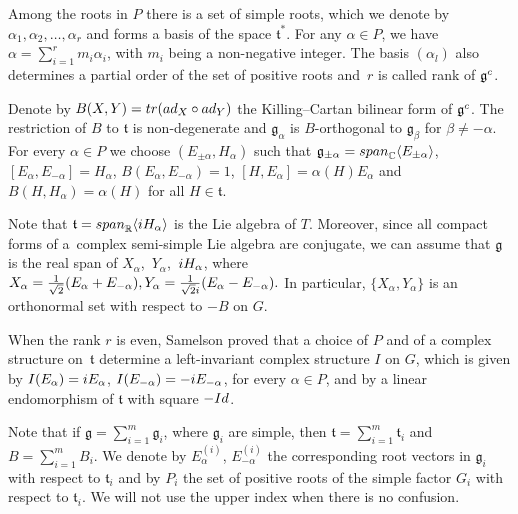 \documentclass[11pt]{article}
\numberwithin{equation}{section}
\numberwithin{equation}{section}
\begin{document}
Among the roots in $P$ there is a set of simple roots, which we denote by $\alpha_1, \alpha_2,\dots ,\alpha_r$ and forms a basis of the space $\mathfrak t^*$. For any $\alpha \in P$, we have $\alpha = \sum_{i =1}^r m_i\alpha_i$, with $m_i$ being a non-negative integer. The basis $(\alpha_l)$ also determines a partial order of the set of positive roots and~$r$ is called rank of $\mathfrak g^{\rm c}$.

Denote by $B(X,Y) = {\rm tr} ({\rm ad}_X \circ {\rm ad}_Y)$ the Killing--Cartan bilinear form of $\mathfrak g^{\rm c}$. The restriction of $B$ to $\mathfrak t$ is non-degenerate and $\mathfrak g_{\alpha}$ is $B$-orthogonal to $\mathfrak g_{\beta}$ for $\beta \neq - \alpha$.
 For every $\alpha \in P$ we choose $(E_{\pm \alpha}, H_{\alpha})$ such that $\mathfrak g_{\pm \alpha}= {\rm {span}}_{\mathbb C} \langle E_{\pm\alpha}\rangle$, $[E_{\alpha}, E_{-\alpha}]=H_{\alpha}$, $B(E_{\alpha}, E_{-\alpha}) = 1$, $[H, E_{\alpha}] = \alpha(H)E_{\alpha}$ and $B(H, H_{\alpha}) = \alpha(H)$ for all $H \in \mathfrak t$.

Note that $\mathfrak t = {\rm span}_{\mathbb R} \langle {\rm i} H_{\alpha}\rangle$ is the Lie algebra of $T$. Moreover, since all compact forms of a~complex semi-simple Lie algebra are conjugate, we can assume that $\mathfrak g$ is the real span of $X_{\alpha}$,~$Y_{\alpha}$,~${\rm i}H_{\alpha}$, where $X_{\alpha} = \frac{1}{\sqrt{2}}(E_{\alpha}+E_{-\alpha}), Y_{\alpha} = \frac{1}{\sqrt{2}{\rm i}}(E_{\alpha}-E_{-\alpha}).$
In particular, $\{ X_{\alpha}, Y_{\alpha} \} $ is an orthonormal set with respect to $- B$ on $G$.


When the rank $r$ is even, Samelson proved that a choice of $P$ and of a complex structure on~$\mathfrak t $ determine a left-invariant complex structure $I$ on $G$, which is given by $I(E_{\alpha})= {\rm i}E_{\alpha}$, $I(E_{-\alpha})=-{\rm i}E_{-\alpha}$, for every $\alpha \in P$, and by a linear endomorphism of $\mathfrak{t}$ with square $-{{\rm Id}}$.

Note that if $ \mathfrak g = \sum_{i =1}^m \mathfrak g_i$, where $\mathfrak g_i$ are simple, then $\mathfrak t= \sum_{i=1}^m \mathfrak t_i$ and $B = \sum_{i=1}^m B_i$. We denote by $E_{\alpha}^{(i)}$, $E_{-\alpha}^{(i)}$ the corresponding root vectors in $\mathfrak g_i$ with respect to $\mathfrak t_i$ and by $P_i$ the set of positive roots of the simple factor $G_i$ with respect to $\mathfrak t_i$. We will not use the upper index when there is no confusion.
\end{document}

